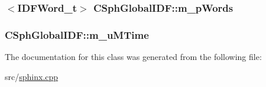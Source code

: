 \hypertarget{classCSphGlobalIDF_aaf1d6ddda9624572339cfe2ad63b4dee}{
\subsubsection[{m\-\_\-p\-Words}]{$<${\bf I\-D\-F\-Word\-\_\-t}$>$ C\-Sph\-Global\-I\-D\-F\-::m\-\_\-p\-Words\hspace{0.3cm}{\ttfamily [protected]}}}\label{classCSphGlobalIDF_aaf1d6ddda9624572339cfe2ad63b4dee}
\hypertarget{classCSphGlobalIDF_a7c40a38a9cf3c45f4b36c425544c5cc2}{
\subsubsection[{m\-\_\-u\-M\-Time}]{ C\-Sph\-Global\-I\-D\-F\-::m\-\_\-u\-M\-Time\hspace{0.3cm}{\ttfamily [protected]}}}\label{classCSphGlobalIDF_a7c40a38a9cf3c45f4b36c425544c5cc2}


The documentation for this class was generated from the following file\-:\begin{DoxyCompactItemize}
\item 
src/\hyperlink{sphinx_8cpp}{sphinx.\-cpp}\end{DoxyCompactItemize}
